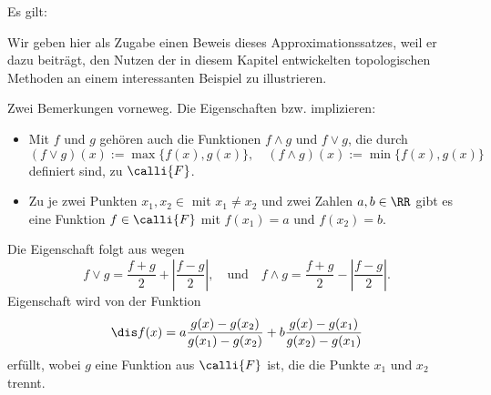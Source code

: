 \begin{antwort}
  Es gilt: 

  \medskip
  Wir geben hier als Zugabe einen Beweis dieses Approximationssatzes, 
  weil er dazu beiträgt, den Nutzen der in diesem Kapitel entwickelten 
  topologischen Methoden an einem interessanten Beispiel zu illustrieren. 

  \medskip\noindent
  Zwei Bemerkungen vorneweg. Die Eigenschaften  bzw.  
  implizieren: 
  {\setlength{\labelsep}{5mm}
    \begin{itemize}
    \item[\desc{i'}] Mit $f$ und $g$ gehören auch die Funktionen 
      $f \wedge g $ und $f\vee g$, die durch 
      \[
      (f \vee g ) (x ) := \max\{ f(x) , g(x) \}, \quad
      (f \wedge g ) (x ) := \min\{ f(x) , g(x) \}
      \]
      definiert sind, zu $\calli{F}$. 
    \item[\desc{ii'}] Zu je zwei Punkten $x_1,x_2 \in $ mit $x_1\not=x_2$ und zwei 
      Zahlen $a,b \in \RR$ gibt es eine Funktion $f\in \calli{F}$ mit 
      $f(x_1)=a$ und $f(x_2)=b$. 
    \end{itemize}}
  Die Eigenschaft  folgt aus  wegen 
  \[
  f\vee g= \frac{f+g}{2}+ \left| \frac{f-g}{2} \right|,\quad\text{und}\quad
  f\wedge g= \frac{f+g}{2}- \left| \frac{f-g}{2} \right|.
  \] 
  Eigenschaft  wird von der Funktion 
  \[
  \dis f(x) = a \frac{g(x)-g(x_2)}{g(x_1)-g(x_2)} +
  b \frac{g(x)-g(x_1)}{g(x_2)-g(x_1)}
  \]
  erfüllt, wobei $g$ eine Funktion 
  aus $\calli{F}$ ist, die die Punkte $x_1$ und $x_2$ trennt.


\end{antwort}
